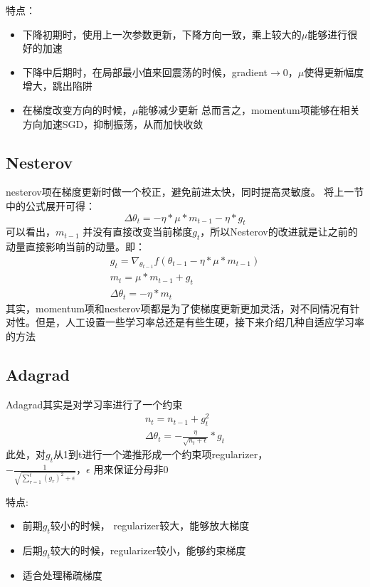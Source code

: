 特点：
\begin{itemize}
\item 下降初期时，使用上一次参数更新，下降方向一致，乘上较大的$\mu$能够进行很好的加速
\item 下降中后期时，在局部最小值来回震荡的时候，gradient$\to$0，$\mu$使得更新幅度增大，跳出陷阱
\item 在梯度改变方向的时候，$\mu$能够减少更新 总而言之，momentum项能够在相关方向加速SGD，抑制振荡，从而加快收敛
\end{itemize}

\subsection{Nesterov}
nesterov项在梯度更新时做一个校正，避免前进太快，同时提高灵敏度。 将上一节中的公式展开可得：
\begin{displaymath}
\Delta{\theta_t}=-\eta*\mu*m_{t-1}-\eta*g_t
\end{displaymath}
可以看出，$m_{t-1}$
并没有直接改变当前梯度$g_t$，所以Nesterov的改进就是让之前的动量直接影响当前的动量。即：
\begin{eqnarray*}
g_t=\nabla_{\theta_{t-1}}{f(\theta_{t-1}-\eta*\mu*m_{t-1})}  \\
m_t=\mu*m_{t-1}+g_t  \\
\Delta{\theta_t}=-\eta*m_t
\end{eqnarray*}
其实，momentum项和nesterov项都是为了使梯度更新更加灵活，对不同情况有针对性。但是，人工设置一些学习率总还是有些生硬，接下来介绍几种自适应学习率的方法

\subsection{Adagrad}
Adagrad其实是对学习率进行了一个约束
\begin{eqnarray*}
n_t=n_{t-1}+g_t^2 \\
\Delta{\theta_t}=-\frac{\eta}{\sqrt{n_t+\epsilon}}*g_t
\end{eqnarray*}
此处，对$g_t$从1到t进行一个递推形成一个约束项regularizer， \\
$-\frac{1}{\sqrt{\sum_{r=1}^t(g_r)^2+\epsilon}}，\epsilon$ 用来保证分母非0

特点:
\begin{itemize}
\item 前期$g_t$较小的时候， regularizer较大，能够放大梯度
\item 后期$g_t$较大的时候，regularizer较小，能够约束梯度
\item 适合处理稀疏梯度
\end{itemize}

